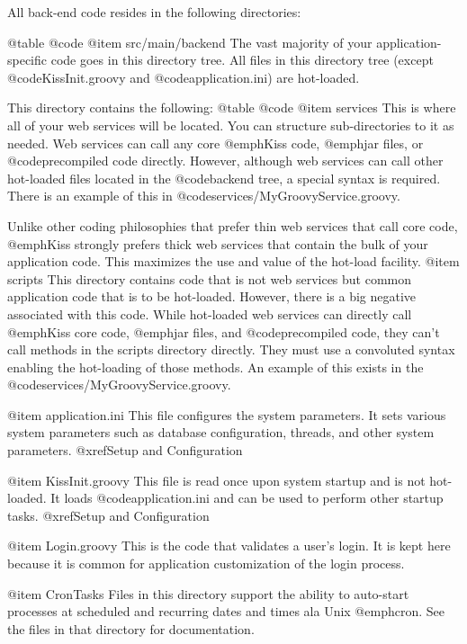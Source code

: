 All back-end code resides in the following directories:


@table @code
@item src/main/backend
The vast majority of your application-specific code goes in this directory tree. 
All files in this directory tree (except @code{KissInit.groovy} and @code{application.ini}) are hot-loaded. 

This directory contains the following:
@table @code
@item services
This is where all of your web services will be located.  You can structure sub-directories to it as needed.
Web services can call any core @emph{Kiss} code, @emph{jar} files, or @code{precompiled} code directly.
However, although web services can call other hot-loaded files located in the @code{backend} tree,
a special syntax is required.  There is an example of this in @code{services/MyGroovyService.groovy}.

Unlike other coding philosophies that prefer thin web services that
call core code, @emph{Kiss} strongly prefers thick web services that
contain the bulk of your application code.  This maximizes the use and
value of the hot-load facility.
@item scripts
This directory contains code that is not web services but common
application code that is to be hot-loaded.  However, there is a big
negative associated with this code.  While hot-loaded web services can
directly call @emph{Kiss} core code, @emph{jar} files, and
@code{precompiled} code, they can't call methods in the scripts
directory directly.  They must use a convoluted syntax enabling the
hot-loading of those methods. An example of this exists in the
@code{services/MyGroovyService.groovy}.

@item application.ini
This file configures the system parameters.  It sets various system
parameters such as database configuration, threads, and other system
parameters. @xref{Setup and Configuration}

@item KissInit.groovy
This file is read once upon system
startup and is not hot-loaded.  It loads @code{application.ini} and can be used to perform other startup tasks.
@xref{Setup and Configuration}

@item Login.groovy
This is the code that validates a user's login.  It is kept here because it is common for application 
customization of the login process.

@item CronTasks
Files in this directory support the ability to auto-start processes at
scheduled and recurring dates and times ala Unix @emph{cron}.  See the
files in that directory for documentation.


